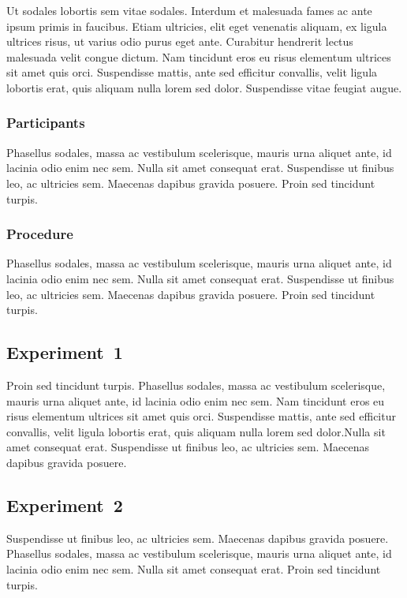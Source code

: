 \documentclass[12pt,oneside]{article}
\begin{document}
Ut sodales lobortis sem vitae sodales. Interdum et malesuada fames ac
ante ipsum primis in faucibus. Etiam ultricies, elit eget venenatis
aliquam, ex ligula ultrices risus, ut varius odio purus eget ante.
Curabitur hendrerit lectus malesuada velit congue dictum. Nam tincidunt
eros eu risus elementum ultrices sit amet quis orci. Suspendisse mattis,
ante sed efficitur convallis, velit ligula lobortis erat, quis aliquam
nulla lorem sed dolor. Suspendisse vitae feugiat augue.

\subsubsection{Participants}\label{participants}

Phasellus sodales, massa ac vestibulum scelerisque, mauris urna aliquet
ante, id lacinia odio enim nec sem. Nulla sit amet consequat erat.
Suspendisse ut finibus leo, ac ultricies sem. Maecenas dapibus gravida
posuere. Proin sed tincidunt turpis.

\subsubsection{Procedure}\label{procedure}

Phasellus sodales, massa ac vestibulum scelerisque, mauris urna aliquet
ante, id lacinia odio enim nec sem. Nulla sit amet consequat erat.
Suspendisse ut finibus leo, ac ultricies sem. Maecenas dapibus gravida
posuere. Proin sed tincidunt turpis.

\subsection{Experiment~1}\label{experiment-1}

Proin sed tincidunt turpis. Phasellus sodales, massa ac vestibulum
scelerisque, mauris urna aliquet ante, id lacinia odio enim nec sem. Nam
tincidunt eros eu risus elementum ultrices sit amet quis orci.
Suspendisse mattis, ante sed efficitur convallis, velit ligula lobortis
erat, quis aliquam nulla lorem sed dolor.Nulla sit amet consequat erat.
Suspendisse ut finibus leo, ac ultricies sem. Maecenas dapibus gravida
posuere.

\subsection{Experiment~2}\label{experiment-2}

Suspendisse ut finibus leo, ac ultricies sem. Maecenas dapibus gravida
posuere. Phasellus sodales, massa ac vestibulum scelerisque, mauris urna
aliquet ante, id lacinia odio enim nec sem. Nulla sit amet consequat
erat. Proin sed tincidunt turpis.
\end{document}
